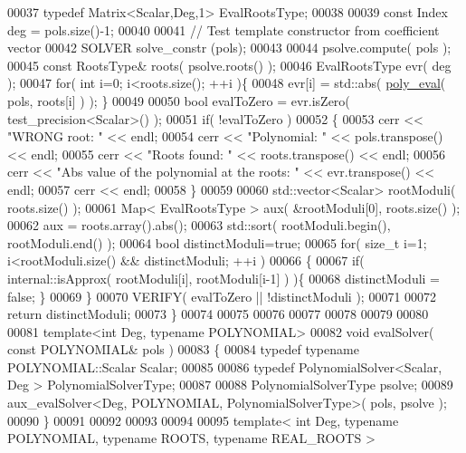 \begin{DoxyCode}
00037   \textcolor{keyword}{typedef} Matrix<Scalar,Deg,1>          EvalRootsType;
00038 
00039   \textcolor{keyword}{const} Index deg = pols.size()-1;
00040 
00041   \textcolor{comment}{// Test template constructor from coefficient vector}
00042   SOLVER solve\_constr (pols);
00043 
00044   psolve.compute( pols );
00045   \textcolor{keyword}{const} RootsType& roots( psolve.roots() );
00046   EvalRootsType evr( deg );
00047   \textcolor{keywordflow}{for}( \textcolor{keywordtype}{int} i=0; i<roots.size(); ++i )\{
00048     evr[i] = std::abs( \hyperlink{namespace_eigen_adb64ffddaa9e83634e3ab0e3fd3664f5}{poly\_eval}( pols, roots[i] ) ); \}
00049 
00050   \textcolor{keywordtype}{bool} evalToZero = evr.isZero( test\_precision<Scalar>() );
00051   \textcolor{keywordflow}{if}( !evalToZero )
00052   \{
00053     cerr << \textcolor{stringliteral}{"WRONG root: "} << endl;
00054     cerr << \textcolor{stringliteral}{"Polynomial: "} << pols.transpose() << endl;
00055     cerr << \textcolor{stringliteral}{"Roots found: "} << roots.transpose() << endl;
00056     cerr << \textcolor{stringliteral}{"Abs value of the polynomial at the roots: "} << evr.transpose() << endl;
00057     cerr << endl;
00058   \}
00059 
00060   std::vector<Scalar> rootModuli( roots.size() );
00061   Map< EvalRootsType > aux( &rootModuli[0], roots.size() );
00062   aux = roots.array().abs();
00063   std::sort( rootModuli.begin(), rootModuli.end() );
00064   \textcolor{keywordtype}{bool} distinctModuli=\textcolor{keyword}{true};
00065   \textcolor{keywordflow}{for}( \textcolor{keywordtype}{size\_t} i=1; i<rootModuli.size() && distinctModuli; ++i )
00066   \{
00067     \textcolor{keywordflow}{if}( internal::isApprox( rootModuli[i], rootModuli[i-1] ) )\{
00068       distinctModuli = \textcolor{keyword}{false}; \}
00069   \}
00070   VERIFY( evalToZero || !distinctModuli );
00071 
00072   \textcolor{keywordflow}{return} distinctModuli;
00073 \}
00074 
00075 
00076 
00077 
00078 
00079 
00080 
00081 \textcolor{keyword}{template}<\textcolor{keywordtype}{int} Deg, \textcolor{keyword}{typename} POLYNOMIAL>
00082 \textcolor{keywordtype}{void} evalSolver( \textcolor{keyword}{const} POLYNOMIAL& pols )
00083 \{
00084   \textcolor{keyword}{typedef} \textcolor{keyword}{typename} POLYNOMIAL::Scalar Scalar;
00085 
00086   \textcolor{keyword}{typedef} PolynomialSolver<Scalar, Deg >              PolynomialSolverType;
00087 
00088   PolynomialSolverType psolve;
00089   aux\_evalSolver<Deg, POLYNOMIAL, PolynomialSolverType>( pols, psolve );
00090 \}
00091 
00092 
00093 
00094 
00095 \textcolor{keyword}{template}< \textcolor{keywordtype}{int} Deg, \textcolor{keyword}{typename} POLYNOMIAL, \textcolor{keyword}{typename} ROOTS, \textcolor{keyword}{typename} REAL\_ROOTS >

\end{DoxyCode}
